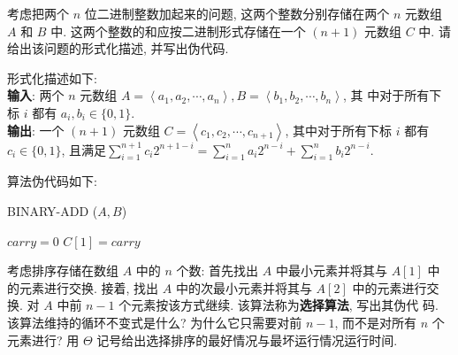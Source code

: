 \documentclass[boxes]{homework}
\begin{document}
\begin{problem}
考虑把两个 $n$ 位二进制整数加起来的问题, 这两个整数分别存储在两个 $n$ 元数组
$A$ 和 $B$ 中. 这两个整数的和应按二进制形式存储在一个 $(n + 1)$ 元数组 $C$ 中.
请给出该问题的形式化描述, 并写出伪代码.
\end{problem}
\begin{solution}
    形式化描述如下:\\
    \textbf{输入}: 两个 $n$ 元数组 $A = \left\langle a_1, a_2, \cdots, a_n
        \right\rangle, B = \left\langle b_1, b_2, \cdots, b_n\right\rangle$, 其
    中对于所有下标 $i$ 都有 $a_i, b_i \in \{0, 1\}$.\\
    \textbf{输出}: 一个 $(n + 1)$ 元数组 $C = \left\langle c_1, c_2, \cdots,
        c_{n + 1}\right\rangle$, 其中对于所有下标 $i$ 都有 $c_i \in \{0, 1\}$,
    且满足$\displaystyle\sum_{i = 1}^{n + 1} c_i 2^{n + 1 - i} = \sum_{i = 1}^n
        a_i 2^{n - i} + \sum_{i = 1}^n b_i 2^{n - i}$.

    算法伪代码如下:

    \begin{algo}
        \caption{BINARY-ADD ($A, B$)}
        \label{alg:binary-add}

        $carry = 0$\;
        $C[1] = carry$\;
    \end{algo}
\end{solution}

\begin{problem}
考虑排序存储在数组 $A$ 中的 $n$ 个数: 首先找出 $A$ 中最小元素并将其与 $A[1]$ 中
的元素进行交换. 接着, 找出 $A$ 中的次最小元素并将其与 $A[2]$ 中的元素进行交换.
对 $A$ 中前 $n - 1$ 个元素按该方式继续. 该算法称为\textbf{选择算法}, 写出其伪代
码. 该算法维持的循环不变式是什么? 为什么它只需要对前 $n - 1$, 而不是对所有 $n$
个元素进行? 用 $\Theta$ 记号给出选择排序的最好情况与最坏运行情况运行时间.
\end{problem}
\end{document}
